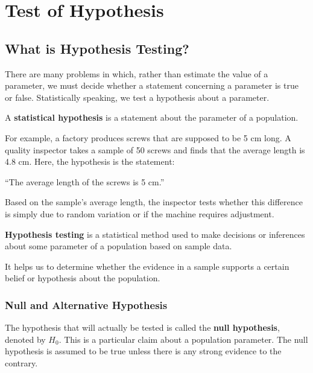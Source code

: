 \documentclass[twoside]{book}
\begin{document}
\chapter{Test of Hypothesis}
\section{What is Hypothesis Testing?}

There are many problems in which, rather than estimate the value of a parameter, we must decide whether a statement concerning a parameter is true or false. Statistically speaking, we test a hypothesis about a parameter.


\begin{textbox}
A \textbf{statistical hypothesis} is a statement about the parameter of a population.
\end{textbox}

For example, a factory produces screws that are supposed to be 5 cm long. A quality inspector takes a sample of 50 screws and finds that the average length is 4.8 cm. Here, the hypothesis is the statement: 

\begin{center}
``{The average length of the screws is 5 cm.}'' 
\end{center} 

Based on the sample's average length, the inspector tests whether this difference is simply due to random variation or if the machine requires adjustment.

\begin{textbox}
\textbf{Hypothesis testing} is a statistical method used to make decisions or inferences about some parameter of a population based on sample data.
\end{textbox}
It helps us to determine whether the evidence in a sample supports a certain belief or hypothesis about the population.

\subsection{Null and Alternative Hypothesis}

The hypothesis that will actually be tested is called the \textbf{null hypothesis}, denoted by $H_0$. This is a particular claim about a population parameter. The null hypothesis is assumed to be true unless there is any strong evidence to the contrary.
\end{document}
